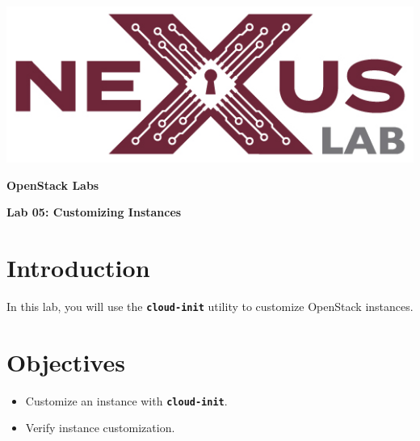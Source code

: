 \documentclass[letterpaper, 12pt]{article}
\begin{document}
\begin{titlepage}
    \centering
    \includegraphics[scale=0.5]{images/nexus_lab_logo.png}

    \vspace*{\baselineskip}

    \textbf{\Large OpenStack Labs}

    \vspace*{\baselineskip}

    \textbf{\Large Lab 05: Customizing Instances}
    \vspace*{\fill}
\end{titlepage}

{
    \fancyhf{}
    \fancyfoot[R]{\footnotesize\thepage}
    \renewcommand{\headrulewidth}{0pt}
}

\pagestyle{fancy}
\tableofcontents
\clearpage

\section*{Introduction}
\label{sec:introduction}
In this lab, you will use the \textbf{\texttt{cloud-init}} utility to customize OpenStack instances.

\section*{Objectives}
\label{sec:objectives}
\begin{itemize}[itemsep=0pt]
    \item Customize an instance with \textbf{\texttt{cloud-init}}.
    \item Verify instance customization.
\end{itemize}
\clearpage
\end{document}
